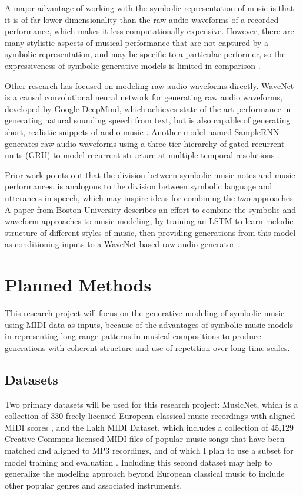 \documentclass[sigconf,authorversion]{acmart}
\begin{document}
A major advantage of working with the symbolic representation of music
is that it is of far lower dimensionality than the raw audio waveforms
of a recorded performance, which makes it less computationally
expensive. However, there are many stylistic aspects of musical
performance that are not captured by a symbolic representation, and
may be specific to a particular performer, so the expressiveness of
symbolic generative models is limited in comparison
\cite{manzelli_conditioning_2018}.

Other research has focused on modeling raw audio waveforms directly. WaveNet is
a causal convolutional neural network for generating raw audio waveforms,
developed by Google DeepMind, which achieves state of the art performance in
generating natural sounding speech from text, but is also capable of generating
short, realistic snippets of audio music \cite{oord_wavenet_2016}.
Another model named SampleRNN generates raw audio waveforms using a three-tier
hierarchy of gated recurrent units (GRU) to model recurrent structure at
multiple temporal resolutions \cite{mehri_samplernn_2017}.

Prior work points out that the division between symbolic music notes
and music performances, is analogous to the division between symbolic
language and utterances in speech, which may inspire ideas for
combining the two approaches \cite{hawthorne2019enabling}. A paper
from Boston University describes an effort to combine the symbolic and
waveform approaches to music modeling, by training an LSTM to learn
melodic structure of different styles of music, then providing
generations from this model as conditioning inputs to a WaveNet-based
raw audio generator \cite{manzelli_conditioning_2018}.

\section{Planned Methods}

This research project will focus on the generative modeling of
symbolic music using MIDI data as inputs, because of the advantages of
symbolic music models in representing long-range patterns in musical
compositions to produce generations with coherent structure and use of
repetition over long time scales.

\subsection{Datasets}

Two primary datasets will be used for this research project: MusicNet,
which is a collection of 330 freely licensed European classical music
recordings with aligned MIDI scores \cite{thickstun2017learning}, and
the Lakh MIDI Dataset, which includes a collection of 45,129 Creative
Commons licensed MIDI files of popular music songs that have been
matched and aligned to MP3 recordings, and of which I plan to use a
subset for model training and evaluation
\cite{raffel_learning-based_2016}. Including this second dataset may
help to generalize the modeling approach beyond European classical
music to include other popular genres and associated instruments.
\end{document}
